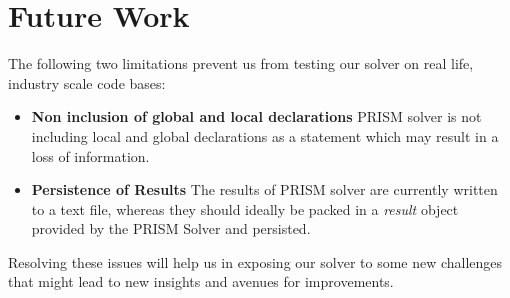 \documentclass[11pt,a4paper,openright]{report}
\begin{document}
\chapter{Future Work}
%  
% 
% 
The following two limitations prevent us from testing our solver on real life, industry scale code bases:
\begin{itemize}

 \item \textbf{Non inclusion of global and local declarations} PRISM solver is not including local and global declarations as a statement which may result in
 a loss of information.
 \item \textbf{Persistence of Results} The results of PRISM solver are currently written to a text file, whereas they should 
 ideally be packed in a \emph{result} object provided by the PRISM Solver and persisted.
\end{itemize}

Resolving these issues will help us in exposing our solver to some new challenges that might lead to new insights and avenues for improvements.
\end{document}
